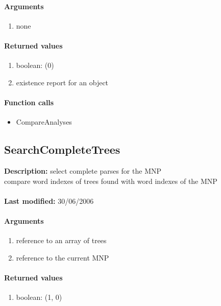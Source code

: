 \paragraph{Arguments}
\begin{enumerate}
\item none
\end{enumerate}

\paragraph{Returned values}
\begin{enumerate}
\item boolean: (0)
\item existence report for an object
\end{enumerate}

\paragraph{Function calls}
\begin{itemize}
\item CompareAnalyses
\end{itemize}

\subsection{SearchCompleteTrees}
\textbf{Description:} select complete parses for the MNP\\
compare word indexes of trees found with word indexes of the MNP\\
\\\textbf{Last modified:} 30/06/2006

\paragraph{Arguments}
\begin{enumerate}
\item reference to an array of trees
\item reference to the current MNP
\end{enumerate}

\paragraph{Returned values}
\begin{enumerate}
\item boolean: (1, 0)
\end{enumerate}

